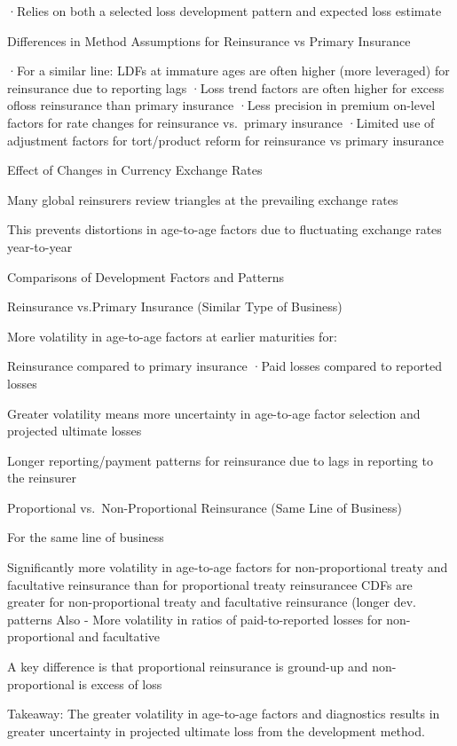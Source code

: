 \documentclass[
]{article}
\begin{document}
·Relies on both a selected loss development pattern and expected loss
estimate

Differences in Method Assumptions for Reinsurance vs Primary Insurance

·For a similar line: LDFs at immature ages are often higher (more
leveraged) for reinsurance due to reporting lags ·Loss trend factors are
often higher for excess ofloss reinsurance than primary insurance ·Less
precision in premium on-level factors for rate changes for reinsurance
vs.~primary insurance ·Limited use of adjustment factors for
tort/product reform for reinsurance vs primary insurance

Effect of Changes in Currency Exchange Rates

Many global reinsurers review triangles at the prevailing exchange rates

This prevents distortions in age-to-age factors due to fluctuating
exchange rates year-to-year

Comparisons of Development Factors and Patterns

Reinsurance vs.Primary Insurance (Similar Type of Business)

More volatility in age-to-age factors at earlier maturities for:

Reinsurance compared to primary insurance ·Paid losses compared to
reported losses

Greater volatility means more uncertainty in age-to-age factor selection
and projected ultimate losses

Longer reporting/payment patterns for reinsurance due to lags in
reporting to the reinsurer

Proportional vs.~Non-Proportional Reinsurance (Same Line of Business)

For the same line of business

Significantly more volatility in age-to-age factors for non-proportional
treaty and facultative reinsurance than for proportional treaty
reinsurancee CDFs are greater for non-proportional treaty and
facultative reinsurance (longer dev. patterns Also - More volatility in
ratios of paid-to-reported losses for non-proportional and facultative

A key difference is that proportional reinsurance is ground-up and
non-proportional is excess of loss

Takeaway: The greater volatility in age-to-age factors and diagnostics
results in greater uncertainty in projected ultimate loss from the
development method.
\end{document}
